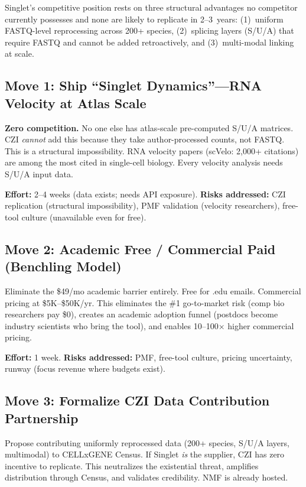 \documentclass[10pt,twocolumn,letterpaper]{article}
\begin{document}
Singlet's competitive position rests on three structural advantages no
competitor currently possesses and none are likely to replicate in 2--3~years:
(1)~uniform FASTQ-level reprocessing across 200+ species, (2)~splicing layers
(S/U/A) that require FASTQ and cannot be added retroactively, and (3)~multi-modal
linking at scale.

\subsection{Move 1: Ship ``Singlet Dynamics''---RNA Velocity at Atlas Scale}

\textbf{Zero competition.} No one else has atlas-scale pre-computed S/U/A matrices.
CZI \emph{cannot} add this because they take author-processed counts, not FASTQ.
This is a structural impossibility. RNA velocity papers (scVelo: 2,000+ citations)
are among the most cited in single-cell biology. Every velocity analysis needs
S/U/A input data.

\textbf{Effort:} 2--4 weeks (data exists; needs API exposure).
\textbf{Risks addressed:} CZI replication (structural impossibility), PMF
validation (velocity researchers), free-tool culture (unavailable even for free).

\subsection{Move 2: Academic Free / Commercial Paid (Benchling Model)}

Eliminate the \$49/mo academic barrier entirely. Free for .edu emails.
Commercial pricing at \$5K--\$50K/yr. This eliminates the \#1 go-to-market risk
(comp bio researchers pay \$0), creates an academic adoption funnel (postdocs
become industry scientists who bring the tool), and enables 10--100$\times$
higher commercial pricing.

\textbf{Effort:} 1 week. \textbf{Risks addressed:} PMF, free-tool culture,
pricing uncertainty, runway (focus revenue where budgets exist).

\subsection{Move 3: Formalize CZI Data Contribution Partnership}

Propose contributing uniformly reprocessed data (200+ species, S/U/A layers,
multimodal) to CELLxGENE Census. If Singlet \emph{is} the supplier, CZI has
zero incentive to replicate. This neutralizes the existential threat, amplifies
distribution through Census, and validates credibility. NMF is already hosted.
\end{document}
